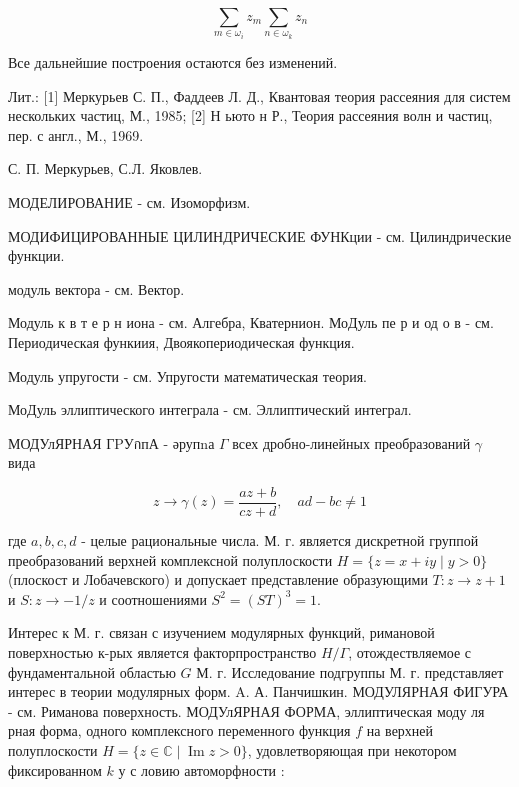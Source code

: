 \documentclass[10pt]{article}
\begin{document}
\[

\sum_{m \in \omega_{i}} z_{m} \sum_{n \in \omega_{k}} z_{n}

\]



Все дальнейшие построения остаются без изменений.



Лит.: [1] Меркурьев С. П., Фаддеев Л. Д., Квантовая теория рассеяния для систем нескольких частиц, М., 1985; [2] Н ьюто н Р., Теория рассеяния волн и частиц, пер. с англ., М., 1969.



С. П. Меркурьев, С.Л. Яковлев.



МОДЕЛИРОВАНИЕ - см. Изоморфизм.



МОДИФИЦИРОВАННЫЕ ЦИЛИНДРИЧЕСКИЕ ФУНКции - см. Цилиндрические функции.



модуль вектора - см. Вектор.



Модуль к в т е р н иона - см. Алгебра, Кватернион. МоДуль пе р и од о в - см. Периодическая функиия, Двоякопериодическая функция.



Модуль упругости - см. Упругости математическая теория.



МоДуль эллиптического интеграла - см. Эллиптический интеграл.



МОДУлЯРНАЯ ГPУกпА - әрупnа $\Gamma$ всех дробно-линейных преобразований $\gamma$ вида



\[

z \rightarrow \gamma(z)=\frac{a z+b}{c z+d}, \quad a d-b c \neq 1

\]



где $a, b, c, d$ - целые рациональные числа. М. г. является дискретной группой преобразований верхней комплексной полуплоскости $H=\{z=x+i y \mid y>0\}$ (плоскост и Лобачевского) и допускает представление образующими $T: z \rightarrow z+1$ и $S: z \rightarrow-1 / z$ и соотношениями $S^{2}=(S T)^{3}=1$.



Интерес к М. г. связан с изучением модулярных функций, римановой поверхностью к-рых является факторпространство $H / \Gamma$, отождествляемое с фундаментальной областью $G$ М. г. Исследование подгруппы М. г. представляет интерес в теории модулярных форм. A. А. Панчишкин. МОДУЛЯРНАЯ ФИГУРА - см. Риманова поверхность. МОДУлЯРНАЯ ФОРМА, эллиптическая моду ля рная форма, одного комплексного переменного функция $f$ на верхней полуплоскости $H=\{z \in \mathbb{C} \mid \operatorname{Im} z>0\}$, удовлетворяющая при некотором фиксированном $k$ у с ловию автоморфности :
\end{document}
